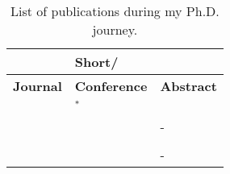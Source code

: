 \begin{table}[ht]
\caption{List of publications during my \acrshort{Ph.D.} journey.}
\label{tbl:publications}
\centering
{}
\begin{tabular}{
    >{\centering\arraybackslash}m{5.5cm}|
    >{\centering\arraybackslash}m{5.4cm}|
    >{\centering\arraybackslash}m{3.1cm}
}
    \hline
    \multicolumn{2}{c|}{
        \textbf{Full}
    } &
    \textbf{Short/} \\
    \cline{1-2}
    \textbf{Journal} &
    \textbf{Conference} & 
    \textbf{Abstract}\\
    \hline 
    \cite{feitosa:2024}     
     &
        \cite{bispojr:2024-isdls}
        \newline
        \cite{bispojr:2024-nmp}$^*$
        \newline
        \cite{cavalcanti:2024-ieee}
        \newline
        \cite{cavalcanti:2024}     
    &
    \cite{pereira:2024}
    \newline
    \cite{boaventura:2024-sbgames}
    \newline
    \cite{bispojr:2024-urca}\\
    \hline
    
    \cite{bispojr:2023-rbie}
    \newline
    \cite{esmeraldo:2023}
    \newline
    \cite{freire:2023-rsc} &
    
    \cite{bispojr:2023-edi}
    \newline
    \cite{boaventura:2023} 
    \newline
    \cite{freire:2023-encompif} &
    
    -\\
    \hline

    \cite{santos:2022}
    \newline
    \cite{lima:2022} &

    \cite{bispojr:2022-educomp}
    \newline
    \cite{esmeraldo:2022} &

    \cite{bispojr:2022-snee}\\
    \hline

    \cite{bispojr:2021} &

    \cite{bispojr:2021-educomp}
    \newline
    \cite{bispojr:2021-wei} &

    -\\
    \hline


\end{tabular}
\end{table}
